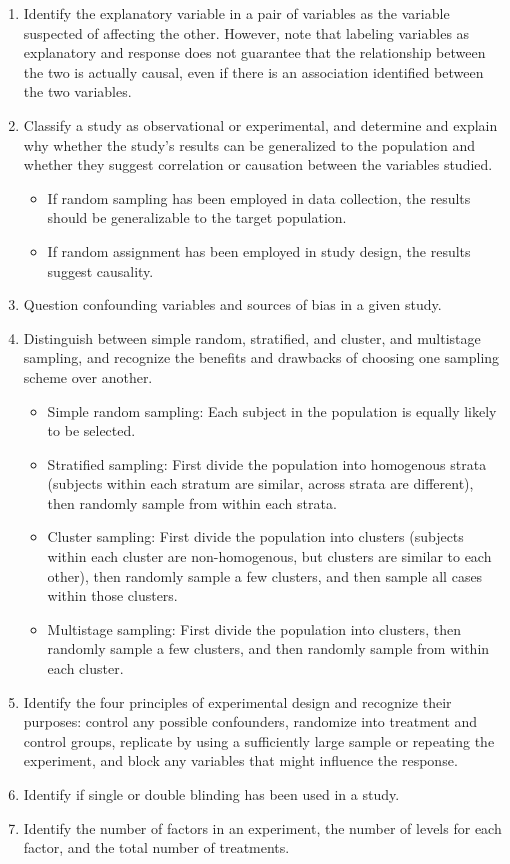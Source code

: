 \documentclass[11pt]{article}
\begin{document}
\begin{enumerate}[resume]
\renewcommand\labelenumi{\textcolor{light}{\textbf{LO \theenumi.}}}
\item Identify the explanatory variable in a pair of variables as the variable suspected of affecting the other. However, note that labeling variables as explanatory and response does not guarantee that the relationship between the two is actually causal, even if there is an association identified between the two variables. 
\item Classify a study as observational or experimental, and determine and explain why whether the study's results can be generalized to the population and whether they suggest correlation or causation between the variables studied.
\begin{itemize}
\renewcommand{\labelitemi}{{\textcolor{dark}{{\tiny $\blacksquare$}}}}
\item If random sampling has been employed in data collection, the results should be generalizable to the target population.
\item If random assignment has been employed in study design, the results suggest causality.
\end{itemize}
\item Question confounding variables and sources of bias in a given study.
\item Distinguish between simple random, stratified, and cluster, and multistage sampling, and recognize the benefits and drawbacks of choosing one sampling scheme over another.
\begin{itemize}
\renewcommand{\labelitemi}{{\textcolor{dark}{{\tiny $\blacksquare$}}}}
\item Simple random sampling: Each subject in the population is equally likely to be selected.
\item Stratified sampling: First divide the population into homogenous strata (subjects within each stratum are similar, across strata are different), then randomly sample from within each strata.
\item Cluster sampling: First divide the population into clusters (subjects within each cluster are non-homogenous, but clusters are similar to each other), then randomly sample a few clusters, and then sample all cases within those clusters. 
\item Multistage sampling: First divide the population into clusters, then randomly sample a few clusters, and then randomly sample from within each cluster. 
\end{itemize}
\item Identify the four principles of experimental design and recognize their purposes: control any possible confounders, randomize into treatment and control groups, replicate by using a sufficiently large sample or repeating the experiment, and block any variables that might influence the response.
\item Identify if single or double blinding has been used in a study.
\item Identify the number of factors in an experiment, the number of levels for each factor, and the total number of treatments.
\end{enumerate}
\end{document}
